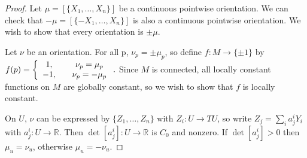 \begin{proof}
Let $\mu = [\{X_1, \dots, X_n\}]$ be a continuous pointwise
orientation. We can check that $-\mu = [\{-X_1, \dots, X_n\}]$ is also
a continuous pointwise orientation. We wish to show that every
orientation is $\pm \mu$.

Let $\nu$ be an orientation. For all p, $\nu_p = \pm \mu_p$, so define
$f: M \to \{ \pm 1 \}$ by
$
  f(p)
= \left\{
    \begin{array}{c c}
      1, & \quad \nu_p = \mu_p \\
     -1, & \quad \nu_p = -\mu_p
    \end{array}
  \right..
$
Since $M$ is connected, all locally constant functions on $M$ are
globally constant, so we wish to show that $f$ is locally constant.

On $U$, $\nu$ can be expressed by $\{Z_1, \dots, Z_n\}$ with
$Z_i : U \to TU$, so write $Z_j = \sum_i a^i_j Y_i$ with
$a^i_j : U \to \mathbb{R}$. Then $\det[a^i_j] : U \to \mathbb{R}$ is
$C_0$ and nonzero. If $\det[a^i_j] > 0$ then $\mu_u = \nu_u$,
otherwise
$\mu_u = -\nu_u$.
\end{proof}

